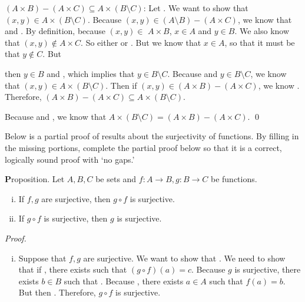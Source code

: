 \documentclass[12pt,letterpaper]{exam}
\newcommand{\blank}[1]{\underline{\hspace{#1}}} %
\begin{document}
\begin{questions}
$(A \times B) - (A \times C) \subseteq A \times (B \setminus C)$: Let \blank{6cm}. We want to \pspace show that $(x, y) \in A \times (B \setminus C)$. Because $(x, y) \in (A \setminus B) - (A \times C)$, we know that \pspace \blank{4.5cm} and \blank{4.5cm}. By definition, because $(x, y) \in$ \pspace $A \times B$, $x \in A$ and $y \in B$. We also know that $(x, y) \notin A \times C$. So either \blank{4cm} \pspace or \blank{4cm}. But we know that $x \in A$, so that it must be that $y \notin C$. But \newpage

\phantom{.}\par\vspace{0.3cm} then $y \in B$ and \blank{3cm}, which implies that $y \in B \setminus C$. Because \blank{3cm} \pspace and $y \in B \setminus C$, we know that $(x, y) \in A \times (B \setminus C)$. Then if $(x, y) \in (A \times B) - (A \times C)$, \pspace we know \blank{6cm}. Therefore, $(A \times B) - (A \times C) \subseteq A \times (B \setminus C)$. \par\vspace{2\baselineskip}

Because \blank{5.5cm} and \blank{5.5cm}, we know \pspace that $A \times (B \setminus C)= (A \times B) - (A \times C)$. \qed



\newpage
\question[10]  Below is a partial proof of results about the surjectivity of functions. By filling in the missing portions, complete the partial proof below so that it is a correct, logically sound proof with `no gaps.' \pspace

{\textbf Proposition.} Let $A, B, C$ be sets and $f: A \to B, g: B \to C$ be functions. 
	\begin{enumerate}[(i)]
	\item If $f, g$ are surjective, then $g \circ f$ is surjective. 
	\item If $g \circ f$ is surjective, then $g$ is surjective. 
	\end{enumerate} \pspace

{\itshape Proof.} 

\begin{enumerate}[(i)]
\item Suppose that $f, g$ are surjective. We want to show that \blank{5cm}. \pspace We need to show that if \blank{3cm}, there exists \blank{3cm} such that \pspace $(g \circ f)(a)= c$. Because $g$ is surjective, there exists $b \in B$ such that \blank{3cm}. \pspace Because \blank{4.5cm}, there exists $a \in A$ such that $f(a)= b$. But then \pspace \blank{7cm}. Therefore, $g \circ f$ is surjective. \par\vspace{2\baselineskip}


\end{enumerate}
\end{questions}
\end{document}
